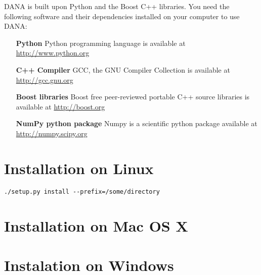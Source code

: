 DANA is built upon Python and the Boost C++ libraries. You need the following
software and their dependencies installed on your computer to use DANA:

\begin{itemize}
    \item [{\bf Python}]
          Python programming language is available at \url{http://www.python.org}\\
          
    \item [{\bf C++ Compiler}]
          GCC, the GNU Compiler Collection is available at \url{http://gcc.gnu.org}\\
          
    \item [{\bf Boost libraries}]
          Boost free peer-reviewed portable C++ source libraries 
          is available at \url{http://boost.org}\\
          
     \item [{\bf NumPy python package}]
           Numpy is a scientific python package available at \url{http://numpy.scipy.org}

\end{itemize}

\section{Installation on Linux}

\begin{verbatim}
./setup.py install --prefix=/some/directory
\end{verbatim}

\section{Installation on Mac OS X}
\section{Instalation on Windows}

